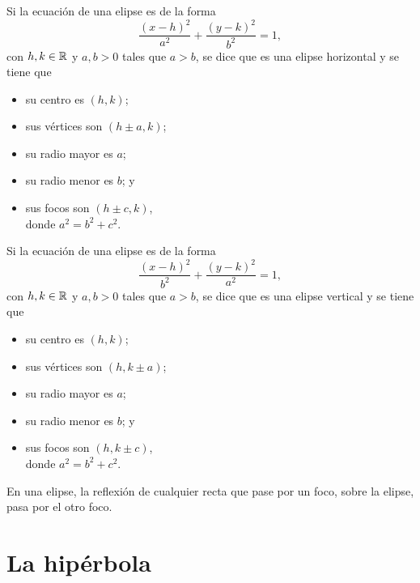\documentclass[a4,11pt]{aleph-notas}
\begin{document}
\begin{teo}
    Si la ecuación de una elipse es de la forma 
    \[
        \dfrac{(x-h)^2}{a^2}+\dfrac{(y-k)^2}{b^2}=1,
    \]
    con $h,k\in\mathbb{R}$ y $a,b>0$ tales que $a>b$, se dice que es una elipse horizontal y se tiene que
    \vspace*{3mm}
    \begin{multicols}{2}
    \begin{itemize}
        \item su centro es $(h,k)$;
        \item sus vértices son $(h\pm a,k)$;
        \item su radio mayor es $a$; 
        \item su radio menor es $b$; y
        \item sus focos son $(h\pm c,k)$,\\ donde $a^2=b^2+c^2$.
    \end{itemize}
    \end{multicols}
\end{teo}


\begin{teo}
    Si la ecuación de una elipse es de la forma 
    \[
        \dfrac{(x-h)^2}{b^2}+\dfrac{(y-k)^2}{a^2}=1,
    \]
    con $h,k\in\mathbb{R}$ y $a,b>0$ tales que $a>b$, se dice que es una elipse vertical y se tiene que
    \begin{multicols}{2}
    \begin{itemize}
        \item su centro es $(h,k)$;
        \item sus vértices son $(h,k\pm a)$; 
        \item su radio mayor es $a$; 
        \item su radio menor es $b$; y
        \item sus focos son $(h,k\pm c)$,\\ donde $a^2=b^2+c^2$.
    \end{itemize}
    \end{multicols}
\end{teo}


\begin{advertencia}
    En una elipse, la reflexión de cualquier recta que pase por un foco, sobre la elipse, pasa por el otro foco.
\end{advertencia}

\section{La hipérbola}
\end{document}
